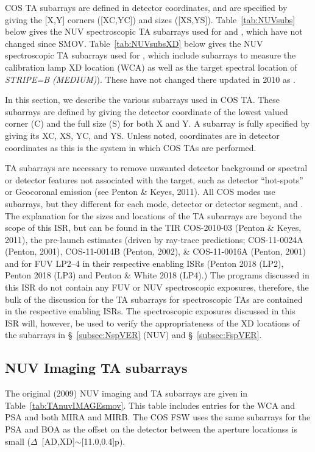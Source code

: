 COS TA subarrays are defined in detector coordinates, and are specified by giving the [X,Y] corners ([XC,YC]) and sizes ([XS,YS]).
Table~\ref{tab:NUVsubs} below gives the NUV spectroscopic TA subarrays used for  and , which have not changed since SMOV.
Table~\ref{tab:NUVsubsXD} below gives the NUV spectroscopic TA subarrays used for , which include subarrays to measure the
calibration lamp XD location (WCA) as well as the target spectral location of \textit{STRIPE=B (MEDIUM)}).
These have not changed there updated in 2010 as .

In this section, we describe the various subarrays used in COS TA.
These subarrays are defined by giving the detector coordinate of the lowest valued corner (C) and the full size (S) for both X and Y.
A subarray is fully specified by giving its XC, XS, YC, and YS. Unless noted, coordinates are in detector coordinates as this is the system in which COS TAs are performed.

TA subarrays are necessary to remove unwanted detector background or spectral or detector features not associated with the target, such as detector
``hot-spots'' or Geocoronal emission (see Penton \& Keyes, 2011). All COS \tacq{} modes use subarrays, but they different for each mode, detector or detector segment,
and \cenwave.  The explanation for the sizes and locations of the TA subarrays are beyond the scope of this ISR, but can be found in the TIR COS-2010-03 (Penton \& Keyes, 2011),
the pre-launch estimates (driven by ray-trace predictions; COS-11-0024A (Penton, 2001), COS-11-0014B (Penton, 2002), \& COS-11-0016A (Penton, 2001) and for
FUV LP2--4 in their respective enabling ISRs (Penton 2018 (LP2), Penton 2018 (LP3) and Penton \& White 2018 (LP4).)
The programs discussed in this ISR do not contain any FUV or NUV spectroscopic \tacq{} exposures, therefore, the bulk of the discussion for the TA subarrays for
spectroscopic TAs are contained in the respective enabling ISRs. The spectroscopic exposures discussed in this ISR will, however, be used to verify
the appropriateness of the XD locations of the subarrays in \S~\ref{subsec:NspVER} (NUV) and \S~\ref{subsec:FspVER}.

\subsection{NUV Imaging TA subarrays}\label{subsec:NUVimSUBS}
The original (2009) NUV imaging  and  TA subarrays are given in Table~\ref{tab:TAnuvIMAGEsmov}.
This table includes entries for the WCA and PSA and both MIRA and MIRB.
The COS FSW uses the same subarrays for the PSA and BOA as the offset on the detector between the aperture locationss is small ($\Delta$~[AD,XD]$\sim$[11.0,0.4]p).

